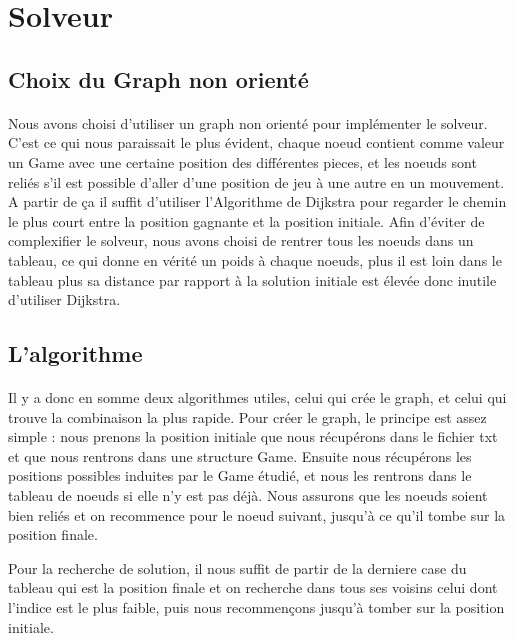 \documentclass {article}
\begin{document}
\section{Solveur}
\subsection{Choix du Graph non orienté}
\paragraph{}
Nous avons choisi d'utiliser un graph non orienté pour implémenter le solveur. C'est ce qui nous paraissait le plus évident, chaque noeud contient comme valeur un Game avec une certaine position des différentes pieces, et les noeuds sont reliés s'il est possible d'aller d'une position de jeu à une autre en un mouvement. A partir de ça il suffit d'utiliser l'Algorithme de Dijkstra pour regarder le chemin le plus court entre la position gagnante et la position initiale. Afin d'éviter de complexifier le solveur, nous avons choisi de rentrer tous les noeuds dans un tableau, ce qui donne en vérité un poids à chaque noeuds, plus il est loin dans le tableau plus sa distance par rapport à la solution initiale est élevée donc inutile d'utiliser Dijkstra.

\subsection{L'algorithme}
\paragraph{}
Il y a donc en somme deux algorithmes utiles, celui qui crée le graph, et celui qui trouve la combinaison la plus rapide. Pour créer le graph, le principe est assez simple : nous prenons la position initiale que nous récupérons dans le fichier txt et que nous rentrons dans une structure Game. Ensuite nous récupérons les positions possibles induites par le Game étudié, et nous les rentrons dans le tableau de noeuds si elle n'y est pas déjà. Nous assurons que les noeuds soient bien reliés et on recommence pour le noeud suivant, jusqu'à ce qu'il tombe sur la position finale.

Pour la recherche de solution, il nous suffit de partir de la derniere case du tableau qui est la position finale et on recherche dans tous ses voisins celui dont l'indice est le plus faible, puis nous recommençons jusqu'à tomber sur la position initiale.
\end{document}
